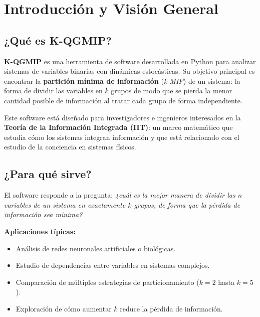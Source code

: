 \section{Introducción y Visión General}
\label{sec:intro}

\subsection{¿Qué es K-QGMIP?}

\textbf{K-QGMIP} es una herramienta de software desarrollada en Python para analizar sistemas de variables binarias con dinámicas estocásticas. Su objetivo principal es encontrar la \textbf{partición mínima de información} (\textit{k-MIP}) de un sistema: la forma de dividir las variables en $k$ grupos de modo que se pierda la menor cantidad posible de información al tratar cada grupo de forma independiente.

\begin{nota}
Este software está diseñado para investigadores e ingenieros interesados en la \textbf{Teoría de la Información Integrada (IIT)}: un marco matemático que estudia cómo los sistemas integran información y que está relacionado con el estudio de la conciencia en sistemas físicos.
\end{nota}

\subsection{¿Para qué sirve?}

El software responde a la pregunta: \textit{¿cuál es la mejor manera de dividir las $n$ variables de un sistema en exactamente $k$ grupos, de forma que la pérdida de información sea mínima?}

\vspace{6pt}
\textbf{Aplicaciones típicas:}
\begin{itemize}[itemsep=4pt]
    \item Análisis de redes neuronales artificiales o biológicas.
    \item Estudio de dependencias entre variables en sistemas complejos.
    \item Comparación de múltiples estrategias de particionamiento ($k=2$ hasta $k=5$).
    \item Exploración de cómo aumentar $k$ reduce la pérdida de información.
\end{itemize}

